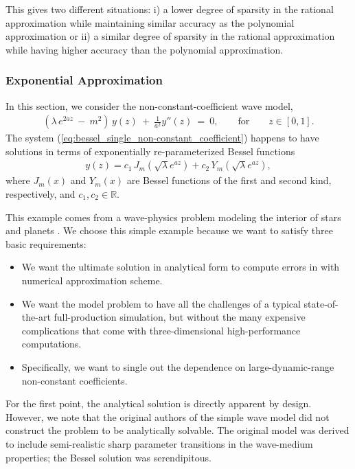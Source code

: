 \documentclass{article}
\begin{document}
This gives two different situations: i) a lower degree of sparsity in the rational approximation while maintaining similar accuracy as the polynomial approximation or ii) a similar degree of sparsity in the rational approximation while having higher accuracy than the polynomial approximation. 

\subsubsection{{Exponential Approximation}}

{In this section, we consider the non-constant-coefficient wave model,
\begin{align}
\label{eq:bessel_single_non-constant_coefficient}
    (\lambda\, e^{2az}\ -\ m^2)\, {y}(z)\ +\ \frac{1}{a^2}{y}''(z)\ =\ 0, \qquad \text{for} \qquad z \in  [0,1].
\end{align}
The system (\ref{eq:bessel_single_non-constant_coefficient}) happens to have solutions in terms of exponentially re-parameterized Bessel functions
\begin{align}
y(z) = c_{1}\, J_{m}(\sqrt{\lambda} e^{az}) + c_{2}\, Y_{m}(\sqrt{\lambda} e^{az}), \label{eq:bessel_equation_general_sol}
\end{align}
where $J_m(x)$ and $Y_m(x)$ are Bessel functions of the first and second kind, respectively, and $c_1,c_2\in\mathbb{R}$.
}

{This example comes from a wave-physics problem modeling the interior of stars and planets \cite{bessel_exponential_paramterization}. We choose this simple example because we want to satisfy three basic requirements: 
\begin{itemize}
    \item We want the ultimate solution in analytical form to compute errors in with numerical approximation scheme. 
    \item We want the model problem to have all the challenges of a typical state-of-the-art full-production simulation, but without the many expensive complications that come with three-dimensional high-performance computations. 
    \item Specifically, we want to single out the dependence on large-dynamic-range non-constant coefficients.  
\end{itemize}}

{For the first point, the analytical solution is directly apparent by design. However, we note that the original authors of the simple wave model did not construct the problem to be analytically solvable. The original model was derived to include semi-realistic sharp parameter transitions in the wave-medium properties; the Bessel solution was serendipitous.}
\end{document}
